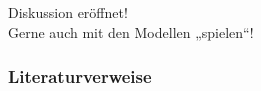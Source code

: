 \documentclass{beamer}
\begin{document}
\begin{frame}[t]
  \begin{center}
    \Huge{Diskussion eröffnet!}\\
    \vspace{1cm}
    \large{Gerne auch mit den Modellen „spielen“!}
  \end{center}
\end{frame}


\begin{frame}[t,allowframebreaks]
  \frametitle{Literaturverweise}
  \nocite{Reuter20}
  \printbibliography
\end{frame}
\end{document}
